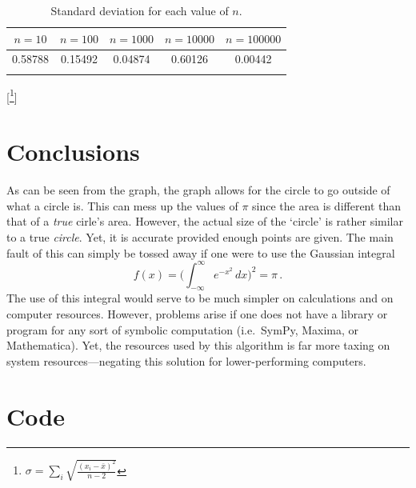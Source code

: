\documentclass[12pt]{article}
\begin{document}
\begin{longtable}[]{@{}ccccc@{}}
\toprule
\(n = 10\) & \(n = 100\) & \(n = 1000\) & \(n = 10000\) &
\(n = 100000\)\tabularnewline
\midrule
\endhead
0.58788 & 0.15492 & 0.04874 & 0.60126 & 0.00442\tabularnewline
\bottomrule
\caption{Standard deviation for each value of $n$.}
\end{longtable}
[\footnote{$\sigma = \sum_i \sqrt{\frac{(x_i - \bar{x})^2}{n - 2}}$}]
\newpage

\section{Conclusions}
As can be seen from the graph, the graph allows for the circle to go outside of what a circle is. This can mess up the values of \(\pi\) since the area is different than that of a \emph{true} cirle's area. However, the actual size of the `circle' is rather similar to a true \emph{circle}. Yet, it is accurate provided enough points are given. The main fault of this can simply be tossed away if one were to use the Gaussian integral
\[f(x) = \bigg(\int_{-\infty}^\infty e^{-x^2}\,dx\bigg)^2 = \pi\,.\]
The use of this integral would serve to be much simpler on calculations and on computer resources. However, problems arise if one does not have a library or program for any sort of symbolic computation (i.e.~SymPy, Maxima, or Mathematica\texttrademark). Yet, the resources used by this algorithm is far more taxing on system resources---negating this solution for lower-performing computers.

\section{Code}
\end{document}
